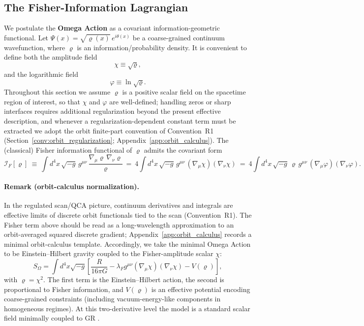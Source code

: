 \subsection{The Fisher-Information Lagrangian}
We postulate the \textbf{Omega Action} as a covariant information-geometric functional. Let $\Psi(x)=\sqrt{\varrho(x)}\,e^{i\theta(x)}$ be a coarse-grained continuum wavefunction, where $\varrho$ is an information/probability density. It is convenient to define both the amplitude field
\begin{equation}
    \chi \equiv \sqrt{\varrho},
\end{equation}
and the logarithmic field
\begin{equation}
    \varphi \equiv \ln \sqrt{\varrho}.
\end{equation}
Throughout this section we assume $\varrho$ is a positive scalar field on the spacetime region of interest, so that $\chi$ and $\varphi$ are well-defined; handling zeros or sharp interfaces requires additional regularization beyond the present effective description, and whenever a regularization-dependent constant term must be extracted we adopt the orbit finite-part convention of Convention~R1 (Section~\ref{conv:orbit_regularization}; Appendix~\ref{app:orbit_calculus}).
The (classical) Fisher information functional of $\varrho$ admits the covariant form \cite{AmariNagaoka2000,Frieden1998}
\begin{equation}
\mathcal{I}_F[\varrho]\ \equiv\ \int d^4x\,\sqrt{-g}\, g^{\mu\nu}\,\frac{\nabla_\mu \varrho\,\nabla_\nu \varrho}{\varrho}
\ =\ 4\int d^4x\,\sqrt{-g}\, g^{\mu\nu}\,(\nabla_\mu \chi)(\nabla_\nu \chi)
\ =\ 4\int d^4x\,\sqrt{-g}\,\varrho\, g^{\mu\nu}\,(\nabla_\mu \varphi)(\nabla_\nu \varphi).
\end{equation}
\paragraph{Remark (orbit-calculus normalization).}
In the regulated scan/QCA picture, continuum derivatives and integrals are effective limits of discrete orbit functionals tied to the scan (Convention~R1). The Fisher term above should be read as a long-wavelength approximation to an orbit-averaged squared discrete gradient; Appendix~\ref{app:orbit_calculus} records a minimal orbit-calculus template.
Accordingly, we take the minimal Omega Action to be Einstein--Hilbert gravity coupled to the Fisher-amplitude scalar $\chi$:
\begin{equation}
    S_{\Omega} = \int d^4x \sqrt{-g} \left[ \frac{R}{16\pi G} - \lambda_{F} g^{\mu\nu} (\nabla_\mu \chi) (\nabla_\nu \chi) - V(\varrho) \right],
\label{eq:omega_action_chi}
\end{equation}
with $\varrho=\chi^2$. The first term is the Einstein--Hilbert action, the second is proportional to Fisher information, and $V(\varrho)$ is an effective potential encoding coarse-grained constraints (including vacuum-energy-like components in homogeneous regimes). At this two-derivative level the model is a standard scalar field minimally coupled to GR \cite{Carroll2004}.

